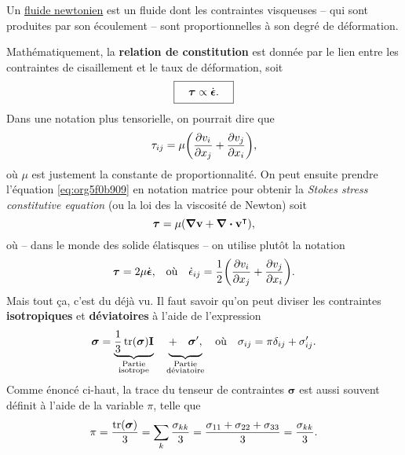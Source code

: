 \documentclass[10pt]{article}
\numberwithin{equation}{section}
\newcommand{\vv}{\vb{v}}
\newcommand{\tall}{\vphantom{pA^{x^x}_p}}
\newcommand{\grande}{\vphantom{\frac{1}{xx}}}
\begin{document}
Un \href{https://en.wikipedia.org/wiki/Newtonian\_fluid}{fluide newtonien} est un fluide dont les contraintes visqueuses -- qui sont produites par son écoulement -- sont proportionnelles à son degré de déformation.\bigskip

Mathématiquement, la \textbf{relation de constitution} est donnée par le lien entre les contraintes de cisaillement et le taux de déformation, soit
\begin{equation}
   \boxed{\tall\quad\boldsymbol{\tau} \propto \dot{\boldsymbol{\epsilon}}.\quad}
\end{equation}
Dans une notation plus tensorielle, on pourrait dire que
\begin{equation}
\label{eq:org5f0b909}
   \tau_{ij} = \mu \qty(\pdv{v_i}{x_j} + \pdv{v_j}{x_i}),
\end{equation}
où \(\mu\) est justement la constante de proportionnalité.
On peut ensuite prendre l'équation \ref{eq:org5f0b909} en notation matrice pour obtenir la \emph{Stokes stress constitutive equation} (ou la loi des la viscosité de Newton) soit
\begin{equation}
   \boldsymbol{\tau} = \mu \qty(\gradient{\vv} + \divergence{\vv}^\intercal),
\end{equation}
où -- dans le monde des solide élatisques -- on utilise plutôt la notation
\begin{align}
   &&\boldsymbol{\tau} = 2\mu \dot{\boldsymbol{\epsilon}},
   && \text{où}
   && \dot{\epsilon}_{ij} = \frac{1}{2}\qty(\pdv{v_i}{x_j} + \pdv{v_j}{x_i}).&&
\end{align}
Mais tout ça, c'est du déjà vu.
Il faut savoir qu'on peut diviser les contraintes \textbf{isotropiques} et \textbf{déviatoires} à l'aide de l'expression
\begin{align}
\label{eq:orgdf38f4d}
   &&\boldsymbol{\sigma} = \underbrace{\frac{1}{3} \trace(\boldsymbol{\sigma})\mathbf{I}}_{\substack{\text{Partie}\\\text{isotrope}}} \quad \underbrace{+\quad\grande\boldsymbol{\sigma}',}_{\substack{\text{Partie}\\ \text{déviatoire}}}
   && \text{où}
   &&\sigma_{ij} = \pi\delta_{ij} + \sigma_{ij}'.&&
\end{align}
Comme énoncé ci-haut, la trace du tenseur de contraintes \(\boldsymbol{\sigma}\) est aussi souvent définit à l'aide de la variable \(\pi\), telle que
\begin{equation}
   \pi = \frac{\trace(\boldsymbol{\sigma})}{3} = \sum_k \frac{\sigma_{kk}}{3} = \frac{\sigma_{11} + \sigma_{22} +\sigma_{33}}{3} = \frac{\sigma_{kk}}{3}.
\end{equation}
\end{document}
